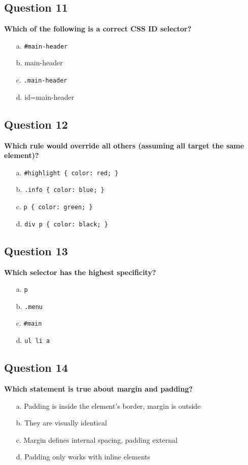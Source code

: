 \documentclass{article}
\begin{document}
\subsection*{Question 11}
\textbf{Which of the following is a correct CSS ID selector?}

\begin{itemize}
  \item[a.] \texttt{\#main-header}
  \item[b.] main-header
  \item[c.] \texttt{.main-header}
  \item[d.] id=main-header
\end{itemize}

\subsection*{Question 12}
\textbf{Which rule would override all others (assuming all target the same element)?}

\begin{itemize}
  \item[a.] \texttt{\#highlight \{ color: red; \}}
  \item[b.] \texttt{.info \{ color: blue; \}}
  \item[c.] \texttt{p \{ color: green; \}}
  \item[d.] \texttt{div p \{ color: black; \}}
\end{itemize}

\subsection*{Question 13}
\textbf{Which selector has the highest specificity?}

\begin{itemize}
  \item[a.] \texttt{p}
  \item[b.] \texttt{.menu}
  \item[c.] \texttt{\#main}
  \item[d.] \texttt{ul li a}
\end{itemize}

\subsection*{Question 14}
\textbf{Which statement is true about margin and padding?}

\begin{itemize}
  \item[a.] Padding is inside the element's border, margin is outside
  \item[b.] They are visually identical
  \item[c.] Margin defines internal spacing, padding external
  \item[d.] Padding only works with inline elements
\end{itemize}
\end{document}
